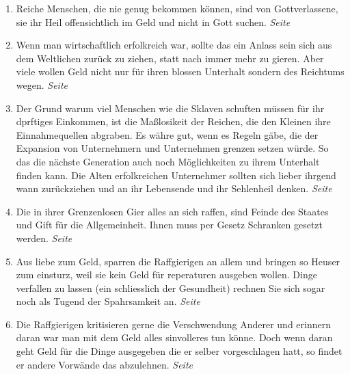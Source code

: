 \begin{enumerate}
 \item Reiche Menschen, die nie genug bekommen können, sind von Gottverlassene,
sie ihr Heil offensichtlich im Geld und nicht in Gott suchen.
 \dotfill \textit{Seite \pageref{ref:13_06_reichtum_unersaettlichkeit}}\\

 \item Wenn man wirtschaftlich erfolkreich war, sollte das ein Anlass sein sich
aus dem Weltlichen zurück zu ziehen, statt nach immer mehr zu gieren. Aber viele
wollen Geld nicht nur für ihren blossen Unterhalt sondern des Reichtums wegen. 
 \dotfill \textit{Seite \pageref{ref:13_07_reichtum_genuegsamkeit}}\\

 \item Der Grund warum viel Menschen wie die Sklaven schuften müssen für ihr
dprftiges Einkommen, ist die Maßlosikeit der Reichen, die den Kleinen ihre
Einnahmequellen abgraben. Es währe gut, wenn es Regeln gäbe, die der Expansion
von Unternehmern und Unternehmen grenzen setzen würde. So das die nächste
Generation auch noch Möglichkeiten zu ihrem Unterhalt finden kann. Die Alten
erfolkreichen Unternehmer sollten sich lieber ihrgend wann zurückziehen und an
ihr Lebensende und ihr Sehlenheil denken.
 \dotfill \textit{Seite \pageref{ref:13_08_reichtum_sklaverei}}\\

 \item Die in ihrer Grenzenlosen Gier alles an sich raffen, sind Feinde des
Staates und Gift für die Allgemeinheit. Ihnen muss per Gesetz Schranken gesetzt
werden.
 \dotfill \textit{Seite \pageref{ref:13_14_reichtum_schaden}}\\

 \item Aus liebe zum Geld, sparren die Raffgierigen an allem und bringen so
Heuser zum einsturz, weil sie kein Geld für reperaturen ausgeben wollen. Dinge
verfallen zu lassen (ein schliesslich der Gesundheit) rechnen Sie sich sogar
noch als Tugend der Spahrsamkeit an. 
 \dotfill \textit{Seite \pageref{ref:13_14_reichtum_einsturz}}\\
 
 \item Die Raffgierigen kritisieren gerne die Verschwendung Anderer und
 erinnern daran war man mit dem Geld alles sinvolleres tun könne. Doch
 wenn daran geht Geld für die Dinge ausgegeben die er selber vorgeschlagen
 hatt, so findet er andere Vorwände das abzulehnen.
 \dotfill \textit{Seite \pageref{ref:13_15_Kapitalisten_kritik}}\\


\end{enumerate}
